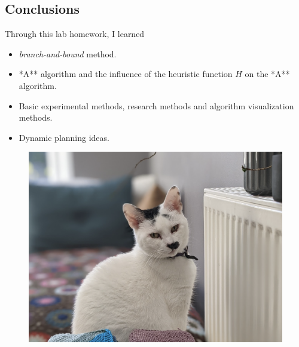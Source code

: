 \documentclass[
]{article}
\begin{document}
\hypertarget{header-n488}{%
\subsection{Conclusions}\label{header-n488}}

Through this lab homework, I learned

\begin{itemize}
\item
  \emph{branch-and-bound} method.
\item
  *A** algorithm and the influence of the heuristic function \(H\) on
  the *A** algorithm.
\item
  Basic experimental methods, research methods and algorithm
  visualization methods.
\item
  Dynamic planning ideas.
\end{itemize}

\begin{figure}
\centering
\includegraphics{./images/panda.png}
\caption{}
\end{figure}
\end{document}

